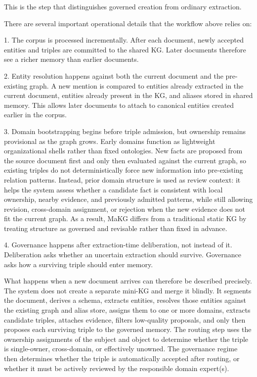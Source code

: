 This is the step that distinguishes governed creation from ordinary
extraction.

There are several important operational details that the workflow above
relies on:

1. The corpus is processed incrementally. After each document, newly
accepted entities and triples are committed to the shared KG. Later
documents therefore see a richer memory than earlier documents.

2. Entity resolution happens against both the current document and the
pre-existing graph. A new mention is compared to entities already
extracted in the current document, entities already present in the KG,
and aliases stored in shared memory. This allows later documents to
attach to canonical entities created earlier in the corpus.

3. Domain bootstrapping begins before triple admission, but ownership
remains provisional as the graph grows. Early domains function as
lightweight organizational shells rather than fixed ontologies. New
facts are proposed from the source document first and only then
evaluated against the current graph, so existing triples do not
deterministically force new information into pre-existing relation
patterns. Instead, prior domain structure is used as review context: it
helps the system assess whether a candidate fact is consistent with
local ownership, nearby evidence, and previously admitted patterns,
while still allowing revision, cross-domain assignment, or rejection
when the new evidence does not fit the current graph. As a result, MaKG
differs from a traditional static KG by treating structure as governed
and revisable rather than fixed in advance.

4. Governance happens after extraction-time deliberation, not instead of
it. Deliberation asks whether an uncertain extraction should survive.
Governance asks how a surviving triple should enter memory.

What happens when a new document arrives can therefore be described
precisely. The system does not create a separate mini-KG and merge it
blindly. It segments the document, derives a schema, extracts entities,
resolves those entities against the existing graph and alias store,
assigns them to one or more domains, extracts candidate triples,
attaches evidence, filters low-quality proposals, and only then proposes
each surviving triple to the governed memory. The routing step uses the
ownership assignments of the subject and object to determine whether the
triple is single-owner, cross-domain, or effectively unowned. The
governance regime then determines whether the triple is automatically
accepted after routing, or whether it must be actively reviewed by the
responsible domain expert(s).

